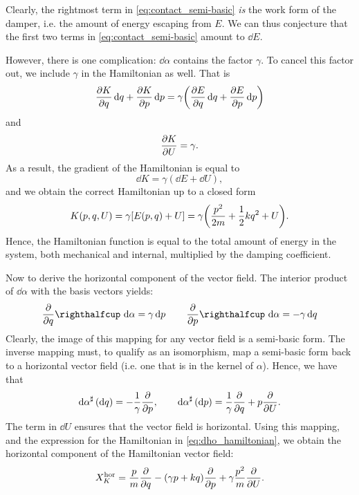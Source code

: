 Clearly, the rightmost term in \cref{eq:contact_semi-basic} \emph{is} the work form of the damper, i.e. the amount of energy escaping from \(E\). We can thus conjecture that the first two terms in \cref{eq:contact_semi-basic} amount to \(\dd{E}\).

However, there is one complication: \(\dd{\alpha}\) contains the factor \(\gamma\). To cancel this factor out, we include \(\gamma\) in the Hamiltonian as well. That is
\begin{equation}
     \pdv{K}{q}\dd{q} + \pdv{K}{p}\dd{p} = \gamma \qty(\pdv{E}{q}\dd{q} + \pdv{E}{p}\dd{p})
\end{equation}
and 
\begin{equation}
     \pdv{K}{U} = \gamma.
\end{equation}
As a result, the gradient of the Hamiltonian is equal to 
\begin{equation}
     \dd{K} = \gamma (\dd{E} + \dd{U}),
\end{equation}
and we obtain the correct Hamiltonian up to a closed form
\begin{equation} 
    K(p, q, U) = \gamma \qty[E(p, q) + U] = \gamma\qty( \frac{p^2}{2m} + \frac{1}{2}kq^2 + U). 
    \label{eq:dho_hamiltonian}
\end{equation} 
Hence, the Hamiltonian function is equal to the total amount of energy in the system, both mechanical and internal, multiplied by the damping coefficient.

Now to derive the horizontal component of the vector field. The interior product of \(\dd{\alpha}\) with the basis vectors yields:
\begin{equation}
    \intpr{\pdv{}{q}}{\dd{\alpha}} = \gamma \dd{p} \qquad \intpr{\pdv{}{p}}{\dd{\alpha}} = -\gamma \dd{q}
\end{equation}
Clearly, the image of this mapping for any vector field is a semi-basic form. The inverse mapping must, to qualify as an isomorphism, map a semi-basic form back to a horizontal vector field (i.e. one that is in the kernel of \(\alpha\)). Hence, we have that
\begin{equation} 
    \dd{\alpha}^\sharp\qty(\dd{q}) = -\frac{1}{\gamma} \pdv{}{p}, \qquad 
    \dd{\alpha}^\sharp\qty(\dd{p}) = \frac{1}{\gamma}\pdv{}{q} +  p \pdv{}{U}. 
\end{equation}
The term in \(\dd{U}\) ensures that the vector field is horizontal. Using this mapping, and the expression for the Hamiltonian in \cref{eq:dho_hamiltonian}, we obtain the horizontal component of the Hamiltonian vector field:
\begin{equation} 
    X_K^\text{hor} = \frac{p}{m}\pdv{}{q} - (\gamma p + kq)\pdv{}{p} + \gamma \frac{p^2}{m} \pdv{}{U}.
    \label{eq:dho_horizontal}
\end{equation}

